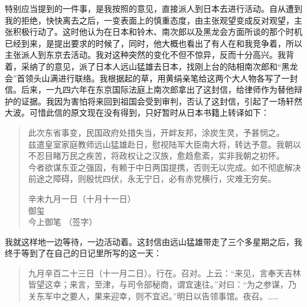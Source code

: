 特别应当提到的一件事，是我按照的意见，直接派人到日本去进行活动。自从遭到我的拒绝，快快离去之后，一变表面上的慎重态度，由主张观望变成反对观望，主张积极行动了。这时他认为在日本和铃木、南次郎以及黑龙会方面所谈的那个时机已经到来，是提出要求的时候了，同时，他大概也看出了有人在和我竞争着，所以主张派人到东京去活动。我对这种突然的变化不但不惊异，反而十分高兴。我背着，采纳了的意见，派了日本人远山猛雄去日本，找刚上台的陆相南次郎和“黑龙会”首领头山满进行联络。我根据起的草，用黄绢亲笔给这两个大人物各写了一封信。后来，一九四六年在东京国际法庭上南次郎拿出了这封信，给律师作为替他辩护的证据。我因为害怕将来回到祖国会受到审判，否认了这封信，引起了一场轩然大波。可惜此信的原文现在没有得到，只好暂时从日本书籍上转译如下：\\

\begin{quote}
	此次东省事变，民国政府处措失当，开衅友邦，涂炭生灵，予甚悯之。\\

兹遣皇室家庭教师远山猛雄赴日，慰视陆军大臣南大将，转达予意。我朝以不忍目睹万民之疾苦，将政权让之汉族，愈趋愈紊，实非我朝之初怀。\\

今者欲谋东亚之强固，有赖于中日两国提携，否则无以完成。如不彻底解决前途之障碍，则殷忧四伏，永无宁日，必有赤党横行，灾难无穷矣。\\

\begin{flushright}
	辛未九月一日（十月十一日）\\

御玺\\

今上御笔       （签字）\\
\end{flushright}
\end{quote}

我就这样地一边等待，一边活动着。这封信由远山猛雄带走了三个多星期之后，我终于等到了在自己的日记里所写的这一天：\\

\begin{quote}
	九月辛百二十三日（十一月二日）。行在。召对。上云：“来见，言奉天吉林皆望这幸；来言，至津，与司令部秘商，谓宜速往。”对曰：“为之参谋，乃关东军中之要人，果来迎幸，则不宜迟。”明日以告领事馆。夜召。……\\
\end{quote}
